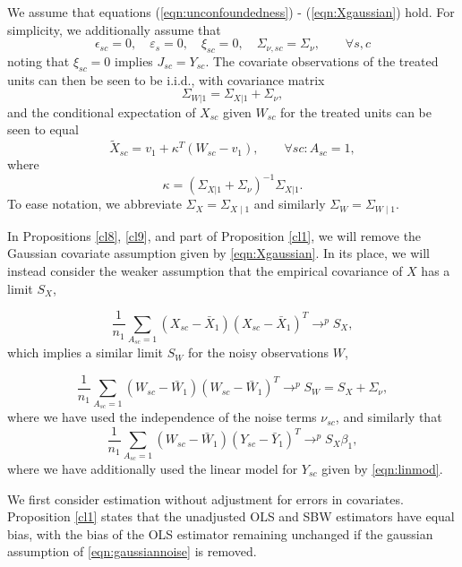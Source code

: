 We assume that equations (\ref{eqn:unconfoundedness}) - (\ref{eqn:Xgaussian}) hold. For simplicity, we additionally assume that
\begin{equation}\label{eqn:simplifications}
\epsilon_{sc} = 0, \quad \varepsilon_s = 0,\quad \xi_{sc} = 0,\quad  \Sigma_{\nu,sc} = \Sigma_\nu, \qquad \forall s,c
\end{equation}
noting that $\xi_{sc}=0$ implies $J_{sc} = Y_{sc}$. The covariate observations of the treated units can then be seen to be i.i.d., with covariance matrix
\[ \Sigma_{W|1} = \Sigma_{X|1} + \Sigma_\nu,\]
and the conditional expectation of $X_{sc}$ given $W_{sc}$ for the treated units can be seen to equal
\[ \tilde{X}_{sc} = v_1 + \kappa^T (W_{sc} - v_1), \qquad \forall sc: A_{sc}=1,\]
where
\[ \kappa = (\Sigma_{X|1} + \Sigma_{\nu})^{-1} \Sigma_{X|1}.\]
To ease notation, we abbreviate $\Sigma_X = \Sigma_{X \mid 1}$ and similarly $ \Sigma_W = \Sigma_{W \mid 1}$. 

In Propositions \ref{cl8}, \ref{cl9}, and part of Proposition \ref{cl1}, we will remove the Gaussian covariate assumption given by \eqref{eqn:Xgaussian}. In its place, we will instead consider the weaker assumption that the empirical covariance of $X$ has a limit $S_X$,

\begin{equation}\label{eqn:limitX}
 \frac{1}{n_1} \sum_{A_{sc}=1} (X_{sc} - \bar{X}_1)(X_{sc} - \bar{X}_1)^T \rightarrow^p S_X,
\end{equation}
which implies a similar limit $S_W$ for the noisy observations $W$,

\begin{equation}\label{eqn:limitW}
 \frac{1}{n_1} \sum_{A_{sc}=1} (W_{sc} - \bar{W}_1)(W_{sc} - \bar{W}_1)^T \rightarrow^p S_W = S_X + \Sigma_{\nu},
\end{equation}
where we have used the independence of the noise terms $\nu_{sc}$, and similarly that 
\begin{equation}\label{eqn:limitWY}
 \frac{1}{n_1} \sum_{A_{sc}=1} (W_{sc} - \bar{W}_1)(Y_{sc} - \bar{Y}_1)^T \rightarrow^p S_X \beta_1,
\end{equation}
where we have additionally used the linear model for $Y_{sc}$ given by \eqref{eqn:linmod}.

We first consider estimation without adjustment for errors in covariates. 
Proposition \ref{cl1} states that the unadjusted OLS and SBW estimators have equal bias, with the bias of the OLS estimator remaining unchanged if the gaussian assumption of \eqref{eqn:gaussiannoise} is removed.

